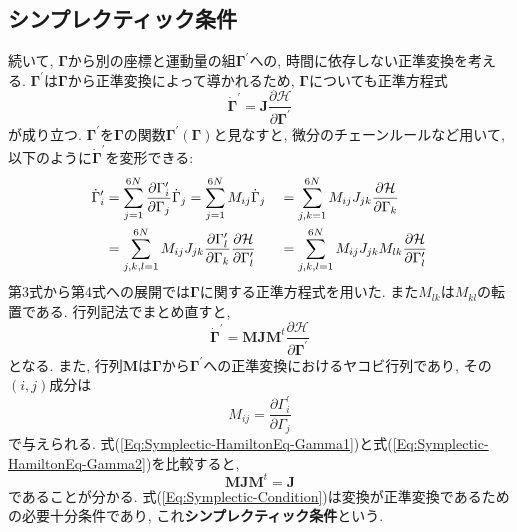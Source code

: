 \subsection{シンプレクティック条件}
続いて, $\bm{\Gamma}$から別の座標と運動量の組$\bm{\Gamma}^{\prime}$への, 時間に依存しない正準変換を考える. 
$\bm{\Gamma}^{\prime}$は$\bm{\Gamma}$から正準変換によって導かれるため, $\bm{\Gamma}$についても正準方程式
\begin{equation}
  \dot{\bm{\Gamma}}^{\prime}
  =
  \bm{J}\frac{\partial \mathcal{H}}{\partial \bm{\Gamma}^{\prime}}
  \label{Eq:Symplectic-HamiltonEq-Gamma1}
\end{equation}
が成り立つ. 
$\bm{\Gamma}^{\prime}$を$\bm{\Gamma}$の関数$\bm{\Gamma}^{\prime}(\bm{\Gamma})$と見なすと, 微分のチェーンルールなど用いて, 以下のように$\dot{\bm{\Gamma}}^{\prime}$を変形できる:
\begin{alignat}{2}
  \dot{\Gamma}_{i}^{\prime}
  &=
  \sum_{j=1}^{6N}
  \frac{\partial \Gamma_{i}^{\prime}}{\partial \Gamma_{j}} \dot{\Gamma}_{j}
  =
  \sum_{j=1}^{6N} M_{ij} \dot{\Gamma}_{j}
  &&=
  \sum_{j,k=1}^{6N}
  M_{ij} J_{jk} \frac{\partial \mathcal{H}}{\partial \Gamma_{k}}
  \notag
  \\
  &=
  \sum_{j,k,l=1}^{6N}
  M_{ij} J_{jk}
  \frac{\partial \Gamma_{l}^{\prime}}{\partial \Gamma_{k}}
  \frac{\partial \mathcal{H}}{\partial \Gamma_{l}^{\prime}}
  &&=
  \sum_{j,k,l=1}^{6N}
  M_{ij} J_{jk} M_{lk}
  \frac{\partial \mathcal{H}}{\partial \Gamma_{l}^{\prime}}
  \notag
\end{alignat}
第3式から第4式への展開では$\bm{\Gamma}$に関する正準方程式を用いた. 
また$M_{lk}$は$M_{kl}$の転置である. 
行列記法でまとめ直すと, 
\begin{equation}
  \dot{\bm{\Gamma}}^{\prime}
  =
  \bm{M} \bm{J} \bm{M}^{t}
  \frac{\partial \mathcal{H}}{\partial \bm{\Gamma}^{\prime}}
  \label{Eq:Symplectic-HamiltonEq-Gamma2}
\end{equation}
となる. また, 行列$\bm{M}$は$\bm{\Gamma}$から$\bm{\Gamma}^{\prime}$への正準変換におけるヤコビ行列であり, その$(i,j)$成分は
\begin{equation}
  M_{ij} = \frac{\partial \Gamma_{i}^{\prime}}{\partial \Gamma_{j}}
  \label{Eq:Jacobi-Matrix}
\end{equation}
で与えられる. 
式(\ref{Eq:Symplectic-HamiltonEq-Gamma1})と式(\ref{Eq:Symplectic-HamiltonEq-Gamma2})を比較すると, 
\begin{equation}
  \bm{M} \bm{J} \bm{M}^{t} = \bm{J}
  \label{Eq:Symplectic-Condition}
\end{equation}
であることが分かる. 
式(\ref{Eq:Symplectic-Condition})は変換が正準変換であるための必要十分条件であり, これ\textbf{シンプレクティック条件}という. 

